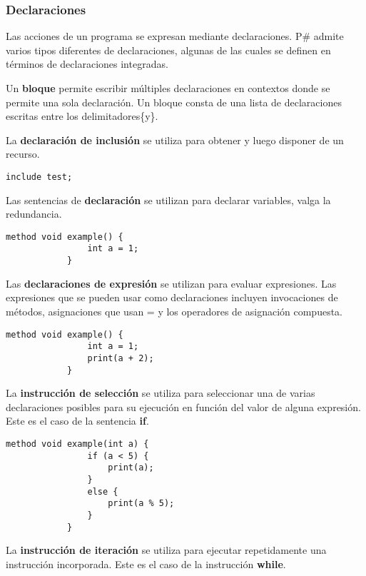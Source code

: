 	\subsubsection{Declaraciones}
		Las acciones de un programa se expresan mediante declaraciones. P\# admite varios tipos diferentes de declaraciones, algunas de las cuales se definen en términos de declaraciones integradas.
		
		Un \textbf{bloque} permite escribir múltiples declaraciones en contextos donde se permite una sola declaración. Un bloque consta de una lista de declaraciones escritas entre los delimitadores\{y\}.
		
		La \textbf{declaración de inclusión} se utiliza para obtener y luego disponer de un recurso.
		
		\begin{lstlisting}[language={PSharp}]
			include test;
		\end{lstlisting}
		
		Las sentencias de \textbf{declaración} se utilizan para declarar variables, valga la redundancia.
		
		\begin{lstlisting}[language={PSharp}]
			method void example() {
				int a = 1;
			}
		\end{lstlisting}
	
		Las \textbf{declaraciones de expresión} se utilizan para evaluar expresiones. Las expresiones que se pueden usar como declaraciones incluyen invocaciones de métodos, asignaciones que usan = y los operadores de asignación compuesta.
		
		\begin{lstlisting}[language={PSharp}]
			method void example() {
				int a = 1;
				print(a + 2);
			}
		\end{lstlisting}
	
		La \textbf{instrucción de selección} se utiliza para seleccionar una de varias declaraciones posibles para su ejecución en función del valor de alguna expresión. Este es el caso de la sentencia \textbf{if}.
		
		\begin{lstlisting}[language={PSharp}]
			method void example(int a) {
				if (a < 5) {
					print(a);
				}
				else {
					print(a % 5);
				}
			}
		\end{lstlisting}
		
		La \textbf{instrucción de iteración} se utiliza para ejecutar repetidamente una instrucción incorporada. Este es el caso de la instrucción \textbf{while}.
		
